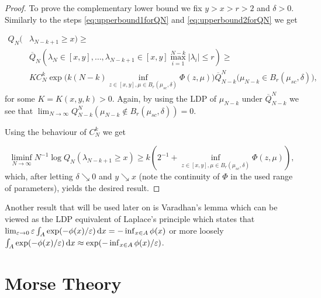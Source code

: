 \begin{proof}
	To prove the complementary lower bound we fix $y>x>r>2$ and $\delta>0$. Similarly to the steps \ref{eq:upperbound1forQN} and \ref{eq:upperbound2forQN} we get
	
	\begin{align*}
		Q_N(&\lambda_{N-k+1}\geq x)\geq \\
		&\overline Q_N(\lambda_N\in[x,y],\dots,\lambda_{N-k+1}\in[x,y]\max_{i=1}^{N-k}|\lambda_i|\leq r)\geq\\
		&KC_N^k\exp\Big(k(N-k)\inf_{z\in[x,y],\mu\in B_r(\mu_{sc},\delta)}\Phi(z,\mu)\Big)\overline Q_{N-k}^N\big(\mu_{N-k}\in B_r(\mu_{sc},\delta)\big),
	\end{align*}
	for some $K=K(x,y,k)>0$. Again, by using the LDP of $\mu_{N-k}$ under $\overline Q_{N-k}^N$ we see that $\lim_{N\rightarrow\infty}Q_{N-k}^N(\mu_{N-k}\notin B_r(\mu_{sc},\delta))=0$.
	
	Using the behaviour of $C_N^k$ we get
	
	\begin{equation*}
		\liminf_{N\rightarrow\infty}N^{-1}\log Q_N(\lambda_{N-k+1}\geq x)\geq k(2^{-1} + \inf_{z\in[x,y],\mu\in B_r(\mu_{sc},\delta)}\Phi(z,\mu)),
	\end{equation*}
	which, after letting $\delta\searrow 0$ and $y\searrow x$ (note the continuity of $\Phi$ in the used range of parameters), yields the desired result.
\end{proof}

Another result that will be used later on is Varadhan's lemma which can be viewed as the LDP equivalent of Laplace's principle which states that $\lim_{\varepsilon\rightarrow 0} \varepsilon \int_A \exp(-\phi(x)/\varepsilon)\mathop{}\!\mathrm{d} x = -\inf_{x\in A} \phi(x)$ or more loosely $\int_A \exp(-\phi(x)/\varepsilon)\mathop{}\!\mathrm{d} x\approx\exp(-\inf_{x\in A}\phi(x)/\varepsilon)$.
\begin{lemma}[Varadhan]
\end{lemma}

\section{Morse Theory}









